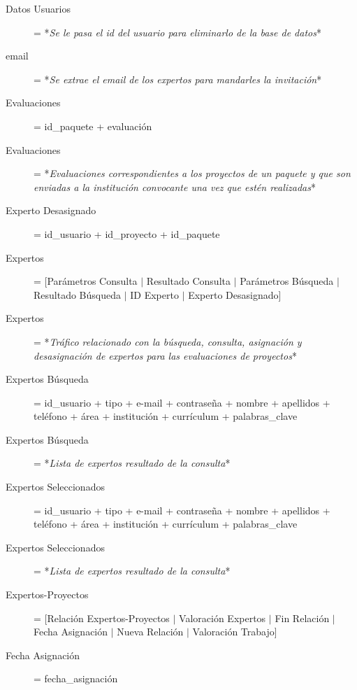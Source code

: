 \documentclass[12pt,a4paper,titlepage,spanish,twoside]{book}
\begin{document}
\begin{description}
\item[Datos Usuarios] = *\emph{Se le pasa el id del usuario para eliminarlo
    de la base de datos}* 

\item[email] = *\emph{Se extrae el email de los expertos para mandarles la
    invitación}* 

\item[Evaluaciones] = id\_paquete + {evaluación}

\item[Evaluaciones] = *\emph{Evaluaciones correspondientes a los proyectos de
    un paquete y que son enviadas a la institución convocante una vez que
    estén realizadas}* 

\item[Experto Desasignado] = id\_usuario + id\_proyecto + id\_paquete

\item[Expertos] = [Parámetros Consulta $\mid$ Resultado Consulta $\mid$
  Parámetros Búsqueda $\mid$ Resultado Búsqueda $\mid$ ID Experto $\mid$
  Experto Desasignado] 

\item[Expertos] = *\emph{Tráfico relacionado con la búsqueda, consulta,
    asignación y desasignación de expertos para las evaluaciones de
    proyectos}* 

\item[Expertos Búsqueda] = {id\_usuario + tipo + e-mail + contraseña +
    nombre + apellidos + teléfono + área + institución + currículum +
    {pa\-la\-bras\_clave}} 

\item[Expertos Búsqueda] = *\emph{Lista de expertos resultado de la
    consulta}* 

\item[Expertos Seleccionados] = {id\_usuario + tipo + e-mail + contraseña +
    nombre + apellidos + teléfono + área + institución + currículum +
    {palabras\_clave}} 

\item[Expertos Seleccionados] = *\emph{Lista de expertos resultado de la
    consulta}* 

\item[Expertos-Proyectos] = [Relación Expertos-Proyectos $\mid$ Valoración
  Expertos $\mid$ Fin Relación $\mid$ Fecha Asignación $\mid$ Nueva Relación
  $\mid$ Valoración Trabajo] 

\item[Fecha Asignación] = fecha\_asignación


\end{description}
\end{document}

